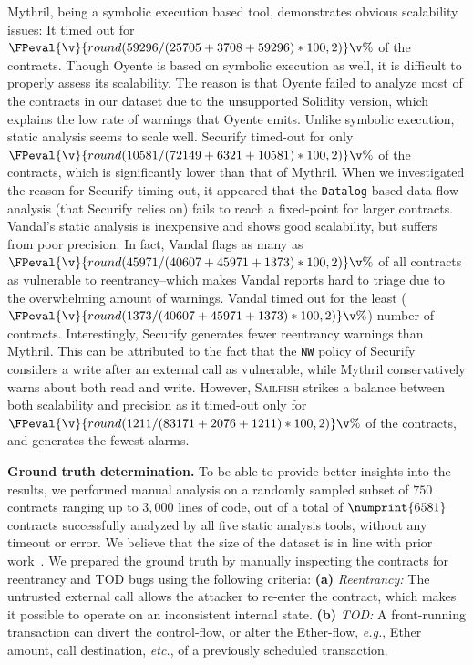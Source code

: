 \documentclass[conference, romanappendices]{tex/IEEEtran}
\theoremstyle{bfnote}
\newcommand{\toolname}{\textsc{Sailfish}\xspace}
\newcommand{\oyente}{{\sc Oyente}\xspace}
\newcommand{\securify}{{\sc Securify}\xspace}
\newcommand{\vandal}{{\sc Vandal}\xspace}
\newcommand{\solidity}{{\sc Solidity}\xspace}
\newcommand{\ether}{{Ether}\xspace}
\newcommand{\reentrancy}{{reentrancy}\xspace}
\newcommand{\mythril}{{\sc Mythril}\xspace}
\newcommand{\etc}{\textit{etc.}}
\newcommand{\eg}{\textit{e.g.}}
\let\num\numprint
\newcommand{\securifySafeDAO}{72149}
\newcommand{\securifyUnsafeDAO}{6321}
\newcommand{\securifyTimeout}{10581}
\newcommand{\mythrilSafeDAO}{25705}
\newcommand{\mythrilUnsafeDAO}{3708}
\newcommand{\mythrilTimeout}{59296}
\newcommand{\vandalSafeDAO}{40607}
\newcommand{\vandalUnsafeDAO}{45971}
\newcommand{\vandalTimeout}{1373}
\newcommand{\clintSafeDAO}{83171}
\newcommand{\clintUnsafeDAO}{2076}
\newcommand{\clintTimeout}{1211}
\newcommand{\manualAnalysisDataset}{750}
\newcommand{\allToolsSuccess}{6581}
\begin{document}
\mythril, being a symbolic execution based tool, demonstrates obvious scalability issues: It timed out for $\FPeval{\v}{round(\mythrilTimeout/(\mythrilSafeDAO+\mythrilUnsafeDAO+\mythrilTimeout)*100,2)}\v\%$ of the contracts.
Though \oyente is based on symbolic execution as well, it is difficult to properly assess its scalability.
The reason is that \oyente failed to analyze most of the contracts in our dataset due to the unsupported \solidity version, which explains the low rate of warnings that \oyente emits.
Unlike symbolic execution, static analysis seems to scale well.
\securify{} timed-out for only $\FPeval{\v}{round(\securifyTimeout/(\securifySafeDAO+\securifyUnsafeDAO+\securifyTimeout)*100,2)}\v\%$ of the contracts, which is significantly lower than that of \mythril.
When we investigated the reason for \securify timing out, it appeared that the \texttt{Datalog}-based data-flow analysis (that \securify relies on) fails to reach a fixed-point for larger contracts.
\vandal's static analysis is inexpensive and shows good scalability, but suffers from poor precision. In fact, \vandal{} flags as many as $\FPeval{\v}{round(\vandalUnsafeDAO/(\vandalSafeDAO+\vandalUnsafeDAO+\vandalTimeout)*100,2)}\v\%$ of all contracts as vulnerable to \reentrancy--which makes \vandal{} reports hard to triage due to the overwhelming amount of warnings.
\vandal{} timed out for the least ($\FPeval{\v}{round(\vandalTimeout/(\vandalSafeDAO+\vandalUnsafeDAO+\vandalTimeout)*100,2)}\v\%$) number of contracts.
Interestingly, \securify{} generates fewer \reentrancy warnings than \mythril.
This can be attributed to the fact that the \texttt{NW} policy of \securify{} considers a write after an external call as vulnerable, while \mythril{} conservatively warns about both read and write.
However, \toolname strikes a balance between both scalability and precision as it timed-out only for $\FPeval{\v}{round(\clintTimeout/(\clintSafeDAO+\clintUnsafeDAO+\clintTimeout)*100,2)}\v\%$ of the contracts, and generates the fewest alarms.


\noindent
\textbf{Ground truth determination.}
\label{subsec:groundtruth}
To be able to provide better insights into the results, we performed manual analysis on a randomly sampled subset of $\manualAnalysisDataset$ contracts ranging up to $3,000$ lines of code, out of a total of $\num{\allToolsSuccess}$ contracts successfully analyzed by all five static analysis tools, without any timeout or error.
We believe that the size of the dataset is in line with prior work~\cite{ethor,zeus}.
We prepared the ground truth by manually inspecting the contracts for \reentrancy and {TOD\EndAccSupp{}} bugs using the following criteria:
\textbf{(a)} \textit{Reentrancy:} The untrusted external call allows the attacker to re-enter the contract, which makes it possible to operate on an inconsistent internal state.
\textbf{(b)} \textit{TOD:} A front-running transaction can divert the control-flow, or alter the \ether-flow, \eg, \ether amount, call destination, \etc, of a previously scheduled transaction.
\end{document}
